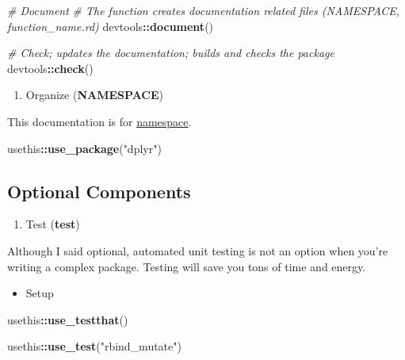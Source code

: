 \documentclass[
]{book}
\newenvironment{Shaded}{\begin{snugshade}}{\end{snugshade}}
\newcommand{\CommentTok}[1]{\textcolor[rgb]{0.56,0.35,0.01}{\textit{#1}}}
\newcommand{\FunctionTok}[1]{\textcolor[rgb]{0.13,0.29,0.53}{\textbf{#1}}}
\newcommand{\NormalTok}[1]{#1}
\newcommand{\SpecialCharTok}[1]{\textcolor[rgb]{0.81,0.36,0.00}{\textbf{#1}}}
\newcommand{\StringTok}[1]{\textcolor[rgb]{0.31,0.60,0.02}{#1}}
\providecommand{\tightlist}{%
  \setlength{\itemsep}{0pt}\setlength{\parskip}{0pt}}
\begin{document}
\begin{Shaded}
\begin{Highlighting}[]
\CommentTok{\# Document }
\CommentTok{\# The function creates documentation related files (NAMESPACE, function\_name.rd)}
\NormalTok{devtools}\SpecialCharTok{::}\FunctionTok{document}\NormalTok{()}

\CommentTok{\# Check; updates the documentation; builds and checks the package }
\NormalTok{devtools}\SpecialCharTok{::}\FunctionTok{check}\NormalTok{()}
\end{Highlighting}
\end{Shaded}

\begin{enumerate}
\def\labelenumi{\arabic{enumi}.}
\setcounter{enumi}{3}
\tightlist
\item
  Organize (\textbf{NAMESPACE})
\end{enumerate}

This documentation is for \href{https://en.wikipedia.org/wiki/Namespace}{namespace}.

\begin{Shaded}
\begin{Highlighting}[]
\NormalTok{usethis}\SpecialCharTok{::}\FunctionTok{use\_package}\NormalTok{(}\StringTok{"dplyr"}\NormalTok{)}
\end{Highlighting}
\end{Shaded}

\subsection{Optional Components}\label{optional-components}

\begin{enumerate}
\def\labelenumi{\arabic{enumi}.}
\tightlist
\item
  Test (\textbf{test})
\end{enumerate}

Although I said optional, automated unit testing is not an option when you're writing a complex package. Testing will save you tons of time and energy.

\begin{itemize}
\tightlist
\item
  Setup
\end{itemize}

\begin{Shaded}
\begin{Highlighting}[]
\NormalTok{usethis}\SpecialCharTok{::}\FunctionTok{use\_testthat}\NormalTok{()}

\NormalTok{usethis}\SpecialCharTok{::}\FunctionTok{use\_test}\NormalTok{(}\StringTok{"rbind\_mutate"}\NormalTok{)}
\end{Highlighting}
\end{Shaded}
\end{document}
